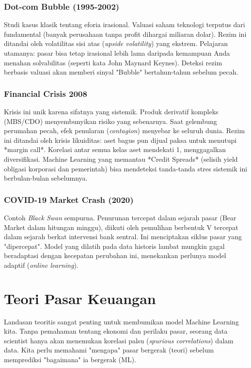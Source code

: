 \documentclass[12pt,a4paper]{book}
\begin{document}
\subsection{Dot-com Bubble (1995-2002)}
Studi kasus klasik tentang eforia irasional. Valuasi saham teknologi terputus dari fundamental (banyak perusahaan tanpa profit dihargai miliaran dolar). Rezim ini ditandai oleh volatilitas sisi atas (\textit{upside volatility}) yang ekstrem. Pelajaran utamanya: pasar bisa tetap irasional lebih lama daripada kemampuan Anda menahan solvabilitas (seperti kata John Maynard Keynes). Deteksi rezim berbasis valuasi akan memberi sinyal "Bubble" bertahun-tahun sebelum pecah.

\subsection{Financial Crisis 2008}
Krisis ini unik karena sifatnya yang sistemik. Produk derivatif kompleks (MBS/CDO) menyembunyikan risiko yang sebenarnya. Saat gelembung perumahan pecah, efek penularan (\textit{contagion}) menyebar ke seluruh dunia. Rezim ini ditandai oleh krisis likuiditas: aset bagus pun dijual paksa untuk menutupi *margin call*. Korelasi antar semua kelas aset mendekati 1, menggagalkan diversifikasi. Machine Learning yang memantau *Credit Spreads* (selisih yield obligasi korporasi dan pemerintah) bisa mendeteksi tanda-tanda stres sistemik ini berbulan-bulan sebelumnya.

\subsection{COVID-19 Market Crash (2020)}
Contoh \textit{Black Swan} sempurna. Penurunan tercepat dalam sejarah pasar (Bear Market dalam hitungan minggu), diikuti oleh pemulihan berbentuk V tercepat dalam sejarah berkat intervensi bank sentral. Ini menciptakan siklus pasar yang "dipercepat". Model yang dilatih pada data historis lambat mungkin gagal beradaptasi dengan kecepatan perubahan ini, menekankan perlunya model adaptif (\textit{online learning}).

\chapter{Teori Pasar Keuangan}
Landasan teoritis sangat penting untuk membumikan model Machine Learning kita. Tanpa pemahaman tentang ekonomi dan perilaku pasar, seorang data scientist hanya akan menemukan korelasi palsu (\textit{spurious correlations}) dalam data. Kita perlu memahami "mengapa" pasar bergerak (teori) sebelum memprediksi "bagaimana" ia bergerak (ML).
\end{document}
